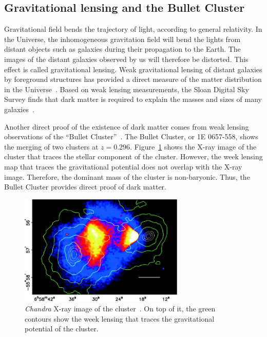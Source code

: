 \documentclass[doublespace,nopageskip]{VTthesis} %
\begin{document}
\subsection{Gravitational lensing and the Bullet Cluster}

Gravitational field bends the trajectory of light, according to general relativity. In the Universe, the inhomogeneous gravitation field will bend the lights from distant objects such as galaxies during their propagation to the Earth. The images of the distant galaxies observed by us will therefore be distorted. This effect is called gravitational lensing. Weak gravitational lensing of distant galaxies by foreground structures has provided a direct measure of the matter distribution in the Universe~\cite{2002NewAR..46..767H}. Based on weak lensing measurements,  the Sloan Digital Sky Survey finds that dark matter is required to explain the masses and sizes of many galaxies~\cite{2006ApJS..162...38A}.

Another direct proof of the existence of dark matter comes from weak lensing observations of the ``Bullet Cluster''~\cite{2006ApJ...648L.109C}. The Bullet Cluster, or 1E 0657-558, shows the merging of two clusters at $z=0.296$. Figure~\ref{fig:bullet} shows the X-ray image of the cluster that traces the stellar component of the cluster. However, the week lensing map that traces the gravitational potential does not overlap with the X-ray image. Therefore, the dominant mass of the cluster is non-baryonic. Thus, the Bullet Cluster provides direct proof of dark matter.

\begin{figure}[htb]
    \centering
    \includegraphics[width=0.7\textwidth]{Figures/Intro/bullet.jpg}
    \caption{\textit{Chandra} X-ray image of the cluster~\cite{2006ApJ...648L.109C}.  On top of it, the green contours show the week lensing that traces the gravitational potential of the cluster. }
    \label{fig:bullet}
\end{figure}
\end{document}
